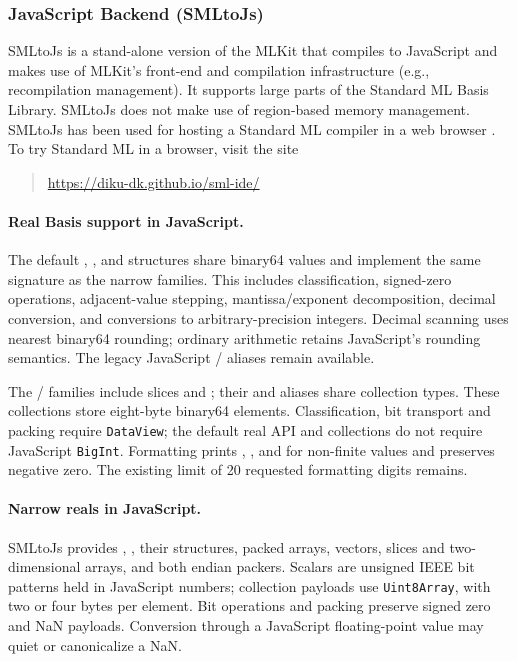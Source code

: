 \documentclass[12pt]{book}
\begin{document}
\subsubsection*{JavaScript Backend (SMLtoJs)}
%

SMLtoJs is a stand-alone version of the MLKit that compiles to JavaScript and
makes use of MLKit's front-end and compilation infrastructure (e.g.,
recompilation management). It supports large parts of the Standard ML Basis
Library. SMLtoJs does not make use of region-based memory management. SMLtoJs
has been used for hosting a Standard ML compiler in a web browser
\cite{10.1145/2093328.2093336}. To try Standard ML in a browser, visit the site

\begin{quote}
\url{https://diku-dk.github.io/sml-ide/}
\end{quote}

\paragraph{Real Basis support in JavaScript.}
The default , , and  structures share
binary64 values and implement the same  signature as the narrow
families. This includes classification, signed-zero operations, adjacent-value
stepping, mantissa/exponent decomposition, decimal conversion, and conversions
to arbitrary-precision integers. Decimal scanning uses nearest binary64
rounding; ordinary arithmetic retains JavaScript's rounding semantics.
The legacy JavaScript / aliases remain available.

The / families include slices and
; their  and  aliases share collection
types. These collections store eight-byte binary64 elements. Classification,
bit transport and packing require \texttt{DataView}; the default real API
and collections do not require JavaScript \texttt{BigInt}. Formatting prints
, , and  for non-finite values and preserves negative
zero. The existing limit of 20 requested formatting digits remains.

\paragraph{Narrow reals in JavaScript.}
SMLtoJs provides , , their  structures,
packed arrays, vectors, slices and two-dimensional arrays, and both endian
packers. Scalars are unsigned IEEE bit patterns held in JavaScript numbers;
collection payloads use \texttt{Uint8Array}, with two or four bytes per element.
Bit operations and packing preserve signed zero and NaN payloads. Conversion
through a JavaScript floating-point value may quiet or canonicalize a NaN.
\end{document}
